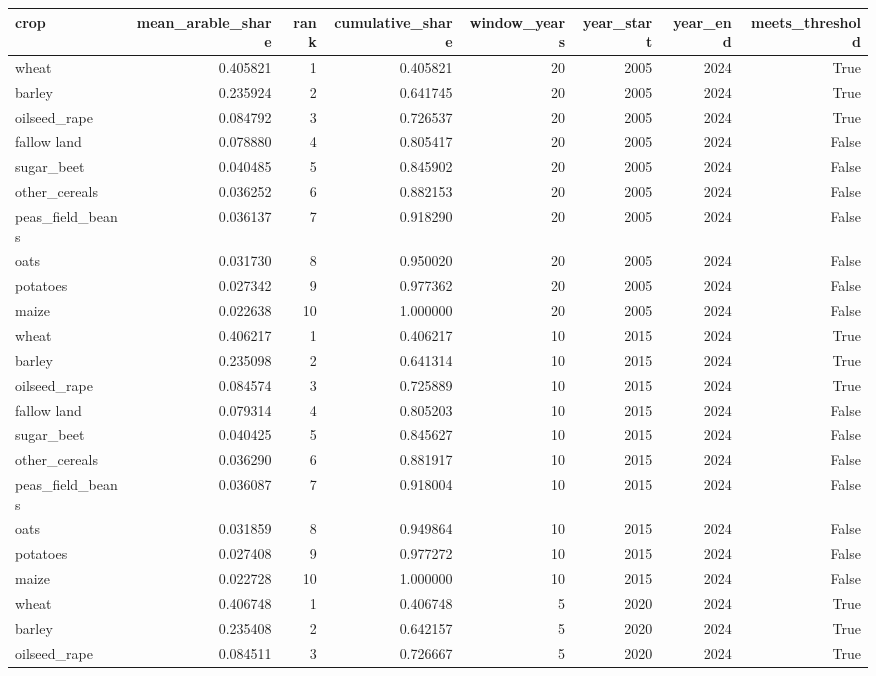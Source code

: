 \begin{tabular}{lrrrrrrr}
\toprule
crop & mean\_arable\_share & rank & cumulative\_share & window\_years & year\_start & year\_end & meets\_threshold \\
\midrule
wheat & 0.405821 & 1 & 0.405821 & 20 & 2005 & 2024 & True \\
barley & 0.235924 & 2 & 0.641745 & 20 & 2005 & 2024 & True \\
oilseed\_rape & 0.084792 & 3 & 0.726537 & 20 & 2005 & 2024 & True \\
fallow land & 0.078880 & 4 & 0.805417 & 20 & 2005 & 2024 & False \\
sugar\_beet & 0.040485 & 5 & 0.845902 & 20 & 2005 & 2024 & False \\
other\_cereals & 0.036252 & 6 & 0.882153 & 20 & 2005 & 2024 & False \\
peas\_field\_beans & 0.036137 & 7 & 0.918290 & 20 & 2005 & 2024 & False \\
oats & 0.031730 & 8 & 0.950020 & 20 & 2005 & 2024 & False \\
potatoes & 0.027342 & 9 & 0.977362 & 20 & 2005 & 2024 & False \\
maize & 0.022638 & 10 & 1.000000 & 20 & 2005 & 2024 & False \\
wheat & 0.406217 & 1 & 0.406217 & 10 & 2015 & 2024 & True \\
barley & 0.235098 & 2 & 0.641314 & 10 & 2015 & 2024 & True \\
oilseed\_rape & 0.084574 & 3 & 0.725889 & 10 & 2015 & 2024 & True \\
fallow land & 0.079314 & 4 & 0.805203 & 10 & 2015 & 2024 & False \\
sugar\_beet & 0.040425 & 5 & 0.845627 & 10 & 2015 & 2024 & False \\
other\_cereals & 0.036290 & 6 & 0.881917 & 10 & 2015 & 2024 & False \\
peas\_field\_beans & 0.036087 & 7 & 0.918004 & 10 & 2015 & 2024 & False \\
oats & 0.031859 & 8 & 0.949864 & 10 & 2015 & 2024 & False \\
potatoes & 0.027408 & 9 & 0.977272 & 10 & 2015 & 2024 & False \\
maize & 0.022728 & 10 & 1.000000 & 10 & 2015 & 2024 & False \\
wheat & 0.406748 & 1 & 0.406748 & 5 & 2020 & 2024 & True \\
barley & 0.235408 & 2 & 0.642157 & 5 & 2020 & 2024 & True \\
oilseed\_rape & 0.084511 & 3 & 0.726667 & 5 & 2020 & 2024 & True \\

\end{tabular}
